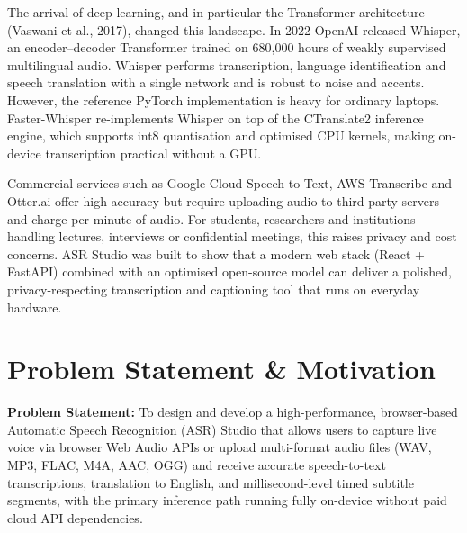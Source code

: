 \documentclass[11pt,a4paper]{article}
\begin{document}
The arrival of deep learning, and in particular the Transformer architecture (Vaswani et al., 2017), changed this landscape. In 2022 OpenAI released Whisper, an encoder--decoder Transformer trained on 680,000 hours of weakly supervised multilingual audio. Whisper performs transcription, language identification and speech translation with a single network and is robust to noise and accents. However, the reference PyTorch implementation is heavy for ordinary laptops. Faster-Whisper re-implements Whisper on top of the CTranslate2 inference engine, which supports int8 quantisation and optimised CPU kernels, making on-device transcription practical without a GPU.

Commercial services such as Google Cloud Speech-to-Text, AWS Transcribe and Otter.ai offer high accuracy but require uploading audio to third-party servers and charge per minute of audio. For students, researchers and institutions handling lectures, interviews or confidential meetings, this raises privacy and cost concerns. ASR Studio was built to show that a modern web stack (React + FastAPI) combined with an optimised open-source model can deliver a polished, privacy-respecting transcription and captioning tool that runs on everyday hardware.

\section{Problem Statement \& Motivation}
\textbf{Problem Statement:} To design and develop a high-performance, browser-based Automatic Speech Recognition (ASR) Studio that allows users to capture live voice via browser Web Audio APIs or upload multi-format audio files (WAV, MP3, FLAC, M4A, AAC, OGG) and receive accurate speech-to-text transcriptions, translation to English, and millisecond-level timed subtitle segments, with the primary inference path running fully on-device without paid cloud API dependencies.
\end{document}
